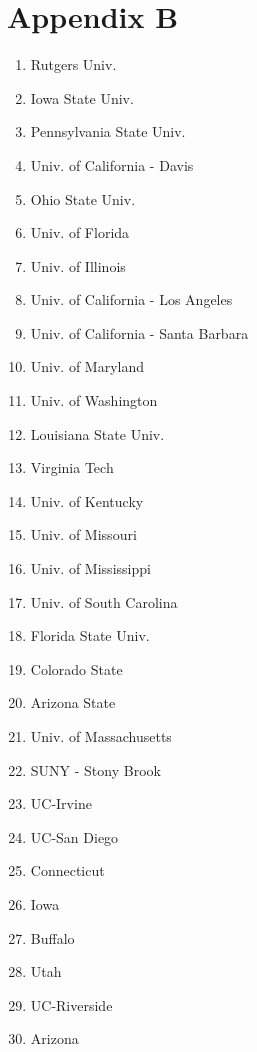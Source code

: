 \documentclass[12pt]{article}
\begin{document}
    \section{Appendix B}
    \begin{enumerate}
    	\item Rutgers Univ.
    	\item Iowa State Univ.
    	\item Pennsylvania State Univ.
    	\item Univ. of California - Davis
    	\item Ohio State Univ.
    	\item Univ. of Florida
    	\item Univ. of Illinois
    	\item Univ. of California - Los Angeles
    	\item Univ. of California - Santa Barbara
    	\item Univ. of Maryland
    	\item Univ. of Washington
    	\item Louisiana State Univ.
    	\item Virginia Tech
    	\item Univ. of Kentucky
    	\item Univ. of Missouri
    	\item Univ. of Mississippi
       	\item Univ. of South Carolina
    	\item Florida State Univ.
    	\item Colorado State
    	\item Arizona State
    	\item Univ. of Massachusetts
    	\item SUNY - Stony Brook
    	\item UC-Irvine
    	\item UC-San Diego
    	\item Connecticut
    	\item Iowa
    	\item Buffalo
    	\item Utah
    	\item UC-Riverside
    	\item Arizona
    \end{enumerate}
	
\end{document}
